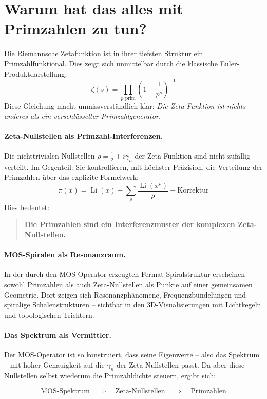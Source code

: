 \section*{Warum hat das alles mit Primzahlen zu tun?}

Die Riemannsche Zetafunktion ist in ihrer tiefsten Struktur ein Primzahlfunktional.  
Dies zeigt sich unmittelbar durch die klassische Euler-Produktdarstellung:
\[
\zeta(s) = \prod_{p \text{ prim}} \left(1 - \frac{1}{p^s} \right)^{-1}
\]
Diese Gleichung macht unmissverständlich klar:  
\emph{Die Zeta-Funktion ist nichts anderes als ein verschlüsselter Primzahlgenerator.}

\paragraph{Zeta-Nullstellen als Primzahl-Interferenzen.}
Die nichttrivialen Nullstellen $\rho = \frac{1}{2} + i\gamma_n$ der Zeta-Funktion sind nicht zufällig verteilt.  
Im Gegenteil: Sie kontrollieren, mit höchster Präzision, die Verteilung der Primzahlen über das explizite Formelwerk:
\[
\pi(x) = \operatorname{Li}(x) - \sum_{\rho} \frac{\operatorname{Li}(x^\rho)}{\rho} + \text{Korrektur}
\]
Dies bedeutet:
\begin{quote}
\textbf{Die Primzahlen sind ein Interferenzmuster der komplexen Zeta-Nullstellen.}
\end{quote}

\paragraph{MOS-Spiralen als Resonanzraum.}
In der durch den MOS-Operator erzeugten Fermat-Spiralstruktur erscheinen sowohl Primzahlen als auch Zeta-Nullstellen als Punkte auf einer gemeinsamen Geometrie.  
Dort zeigen sich Resonanzphänomene, Frequenzbündelungen und spiralige Schalenstrukturen – sichtbar in den 3D-Visualisierungen mit Lichtkegeln und topologischen Trichtern.

\paragraph{Das Spektrum als Vermittler.}
Der MOS-Operator ist so konstruiert, dass seine Eigenwerte – also das Spektrum – mit hoher Genauigkeit auf die $\gamma_n$ der Zeta-Nullstellen passt.  
Da aber diese Nullstellen selbst wiederum die Primzahldichte steuern, ergibt sich:

\[
\boxed{\text{MOS-Spektrum} \quad \Longrightarrow \quad \text{Zeta-Nullstellen} \quad \Longrightarrow \quad \text{Primzahlen}}
\]

